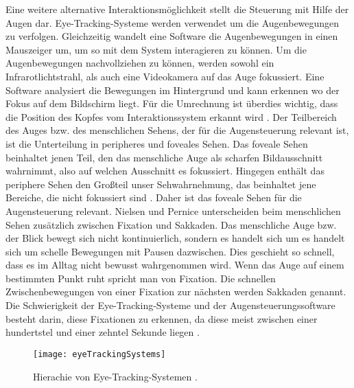Eine weitere alternative Interaktionsmöglichkeit stellt die Steuerung mit Hilfe der Augen dar. Eye-Tracking-Systeme werden verwendet um die Augenbewegungen zu verfolgen. Gleichzeitig wandelt eine Software die Augenbewegungen in einen Mauszeiger um, um so mit dem System interagieren zu können. 
\newline \newline
Um die Augenbewegungen nachvollziehen zu können, werden sowohl ein Infrarotlichtstrahl, als auch eine Videokamera auf das Auge fokussiert. Eine Software analysiert die Bewegungen im Hintergrund und kann erkennen wo der Fokus auf dem Bildschirm liegt. Für die Umrechnung ist überdies wichtig, dass die Position des Kopfes vom Interaktionssystem erkannt wird \cite{NielsenPernice}.
\newline \newline
Der Teilbereich des Auges bzw. des menschlichen Sehens, der für die Augensteuerung relevant ist, ist die Unterteilung in peripheres und foveales Sehen. Das foveale Sehen beinhaltet jenen Teil, den das menschliche Auge als scharfen Bildausschnitt wahrnimmt, also auf welchen Ausschnitt es fokussiert. Hingegen enthält das periphere Sehen den Großteil unser Sehwahrnehmung, das beinhaltet jene Bereiche, die nicht fokussiert sind \cite{NielsenPernice}. Daher ist das foveale Sehen für die Augensteuerung relevant.
\newline \newline
Nielsen und Pernice \cite{NielsenPernice} unterscheiden beim menschlichen Sehen zusätzlich zwischen Fixation und Sakkaden. Das menschliche Auge bzw. der Blick bewegt sich nicht kontinuierlich, sondern es handelt sich um es handelt sich um schelle Bewegungen mit Pausen dazwischen. Dies geschieht so schnell, dass es im Alltag nicht bewusst wahrgenommen wird. Wenn das Auge auf einem bestimmten Punkt ruht spricht man von Fixation. Die schnellen Zwischenbewegungen von einer Fixation zur nächsten werden Sakkaden genannt. Die Schwierigkeit der Eye-Tracking-Systeme und der Augensteuerungssoftware besteht darin, diese Fixationen zu erkennen, da diese meist zwischen einer hundertstel und einer zehntel Sekunde liegen \cite{NielsenPernice}.
\begin{figure}
\centering
\texttt{[image: eyeTrackingSystems]}
\caption{Hierachie von Eye-Tracking-Systemen \cite{Duchowski}.}
\label{fig:eyeTrackingSystems}
\end{figure}
\newline \newline
